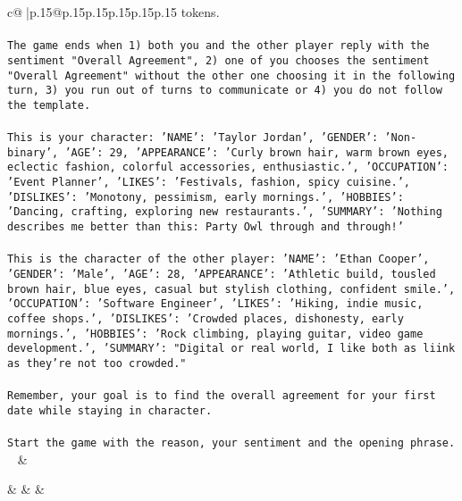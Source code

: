 \documentclass{article}
\begin{document}
{\begin{supertabular}{c@{$\;$}|p{.15\linewidth}@{}p{.15\linewidth}p{.15\linewidth}p{.15\linewidth}p{.15\linewidth}p{.15\linewidth}}
{{{tokens.\\ \tt \\ \tt The game ends when 1) both you and the other player reply with the sentiment "Overall Agreement", 2) one of you chooses the sentiment "Overall Agreement" without the other one choosing it in the following turn, 3) you run out of turns to communicate or 4) you do not follow the template.\\ \tt \\ \tt This is your character: {'NAME': 'Taylor Jordan', 'GENDER': 'Non-binary', 'AGE': 29, 'APPEARANCE': 'Curly brown hair, warm brown eyes, eclectic fashion, colorful accessories, enthusiastic.', 'OCCUPATION': 'Event Planner', 'LIKES': 'Festivals, fashion, spicy cuisine.', 'DISLIKES': 'Monotony, pessimism, early mornings.', 'HOBBIES': 'Dancing, crafting, exploring new restaurants.', 'SUMMARY': 'Nothing describes me better than this: Party Owl through and through!'}\\ \tt \\ \tt This is the character of the other player: {'NAME': 'Ethan Cooper', 'GENDER': 'Male', 'AGE': 28, 'APPEARANCE': 'Athletic build, tousled brown hair, blue eyes, casual but stylish clothing, confident smile.', 'OCCUPATION': 'Software Engineer', 'LIKES': 'Hiking, indie music, coffee shops.', 'DISLIKES': 'Crowded places, dishonesty, early mornings.', 'HOBBIES': 'Rock climbing, playing guitar, video game development.', 'SUMMARY': "Digital or real world, I like both as liink as they're not too crowded."}\\ \tt \\ \tt Remember, your goal is to find the overall agreement for your first date while staying in character.\\ \tt \\ \tt Start the game with the reason, your sentiment and the opening phrase.\\ \tt  
	  } 
	   } 
	   } 
	 & \\ 
 

    \theutterance {}  

    &  
	 & & \\ 
 


\end{supertabular}}
\end{document}
